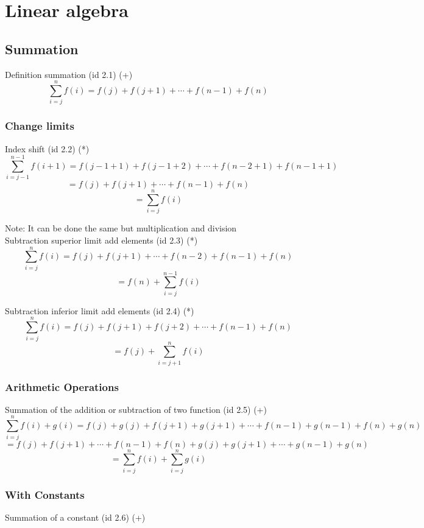 \documentclass{book}
\begin{document}
        \section{Linear algebra}
            \subsection{Summation}
                Definition summation (id 2.1) (+)
                \[\sum^n_{i=j} f(i) = f(j) + f(j + 1) + \cdots + f(n - 1) + f(n)\]
            
                \subsubsection{Change limits}
                    Index shift (id 2.2) (*)
                    \[\sum^{n - 1}_{i=j - 1} f(i + 1) = f(j - 1 + 1) + f(j - 1 + 2) + \cdots + f(n - 2 + 1) + f(n - 1 + 1)\]
                    \[= f(j) + f(j + 1) + \cdots + f(n - 1) + f(n)\]
                    \[= \sum^n_{i=j} f(i)\]

                    Note: It can be done the same but multiplication and division\\

                    Subtraction superior limit add elements (id 2.3) (*)
                    \[\sum^n_{i=j}f(i) = f(j) + f(j + 1) + \cdots + f(n - 2) + f(n - 1) + f(n)\]
                    \[= f(n) + \sum^{n - 1}_{i=j}f(i)\]

                    Subtraction inferior limit add elements (id 2.4) (*)
                    \[\sum^n_{i=j}f(i) = f(j) + f(j + 1) + f(j + 2) + \cdots + f(n - 1) + f(n)\]
                    \[= f(j) + \sum^{n}_{i=j+1} f(i)\]

                \subsubsection{Arithmetic Operations}
                    Summation of the addition or subtraction of two function (id 2.5) (+)
                    \[\sum^n_{i=j} f(i) + g(i) = f(j) + g(j) + f(j + 1) + g(j + 1) + \cdots + f(n - 1) + g(n - 1) + f(n) + g(n)\]
                    \[= f(j) + f(j + 1) + \cdots + f(n - 1) + f(n) + g(j) + g(j + 1) + \cdots + g(n - 1) + g(n)\]
                    \[= \sum^n_{i=j} f(i) + \sum^n_{i=j} g(i)\]

                \subsubsection{With Constants}
                    Summation of a constant (id 2.6) (+) \\
                    
\end{document}
